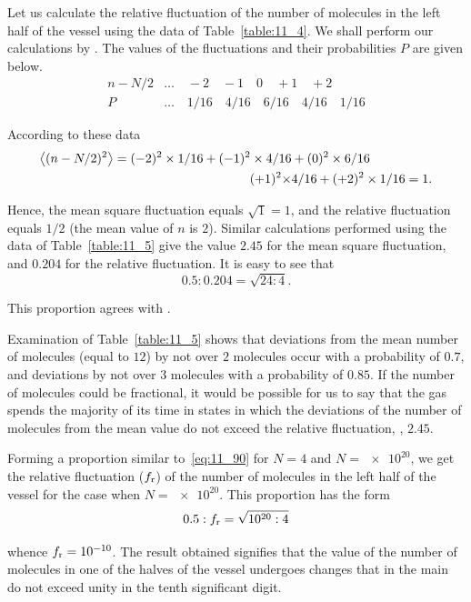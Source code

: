 Let us calculate the relative fluctuation of the number of molecules in the left half of the vessel using the data of Table~\ref{table:11_4}. We shall perform our calculations by . The values of the fluctuations and their probabilities $P$ are given below.
\begin{align*}
	n-N/2 & \ldots \quad -2 \quad -1 \quad 0 \quad +1 \quad +2\\
	P & \ldots \quad 1/16 \quad 4/16 \quad 6/16 \quad 4/16 \quad 1/16
\end{align*}

According to these data
\begin{align*}
	\left\langle (n-N/2)^2 \right\rangle = (-2)^2 \times 1/16 + (-1)^2 \times 4/16 &+ (0)^2 \times 6/16 \\
	(+1)^2 \times &4/16 + (+2)^2 \times 1/16 = 1.
\end{align*}

\noindent
Hence, the mean square fluctuation equals $\sqrt{1}=1$, and the relative fluctuation equals $1/2$ (the mean value of $n$ is $2$). Similar calculations performed using the data of Table~\ref{table:11_5} give the value $2.45$ for the mean square fluctuation, and $0.204$ for the relative fluctuation. It is easy to see that
\begin{equation}\label{eq:11_90}
	0.5 : 0.204 = \sqrt{24 : 4}.
\end{equation}

\noindent
This proportion agrees with .

Examination of Table~\ref{table:11_5} shows that deviations from the mean number of molecules (equal to $12$) by not over $2$ molecules occur with a probability of $0.7$, and deviations by not over $3$ molecules with a probability of $0.85$. If the number of molecules could be fractional, it would be possible for us to say that the gas spends the majority of its time in states in which the deviations of the number of molecules from the mean value do not exceed the relative fluctuation, \ie, $2.45$.

Forming a proportion similar to~\eqref{eq:11_90} for $N=4$ and $N=\num{e20}$, we get the relative fluctuation ($f_{\text{r}}$) of the number of molecules in the left half of the vessel for the case when $N=\num{e20}$. This proportion has the form
\begin{equation*}
	0.5 : f_{\text{r}}=\sqrt{\num{e20} : 4}
\end{equation*}

\noindent
whence $f_{\text{r}}=\num{e-10}$. The result obtained signifies that the value of the number of molecules in one of the halves of the vessel undergoes changes that in the main do not exceed unity in the tenth significant digit.

